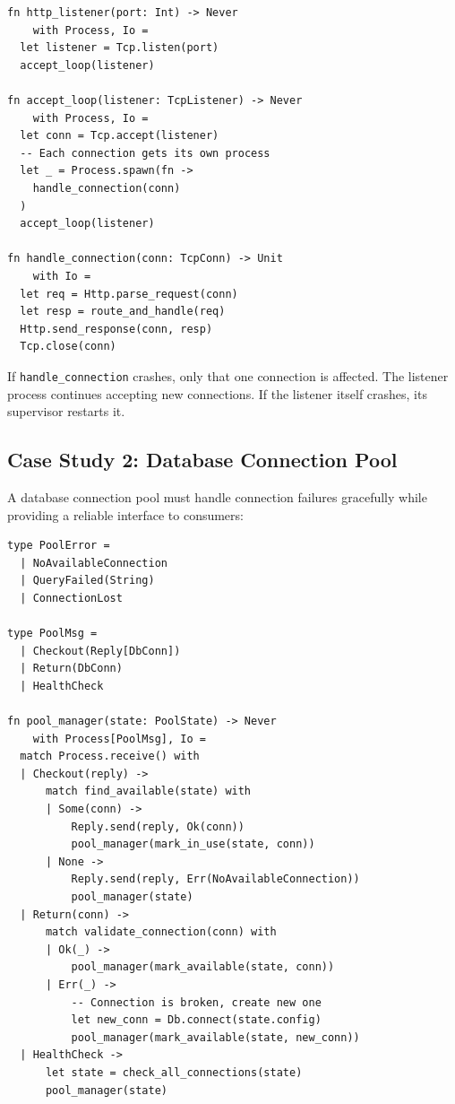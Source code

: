 \documentclass[11pt,twocolumn]{article}
\begin{document}
\begin{lstlisting}
fn http_listener(port: Int) -> Never
    with Process, Io =
  let listener = Tcp.listen(port)
  accept_loop(listener)

fn accept_loop(listener: TcpListener) -> Never
    with Process, Io =
  let conn = Tcp.accept(listener)
  -- Each connection gets its own process
  let _ = Process.spawn(fn ->
    handle_connection(conn)
  )
  accept_loop(listener)

fn handle_connection(conn: TcpConn) -> Unit
    with Io =
  let req = Http.parse_request(conn)
  let resp = route_and_handle(req)
  Http.send_response(conn, resp)
  Tcp.close(conn)
\end{lstlisting}

If \texttt{handle\_connection} crashes, only that one connection is affected. The listener process continues accepting new connections. If the listener itself crashes, its supervisor restarts it.

\subsection{Case Study 2: Database Connection Pool}

A database connection pool must handle connection failures gracefully while providing a reliable interface to consumers:

\begin{lstlisting}
type PoolError =
  | NoAvailableConnection
  | QueryFailed(String)
  | ConnectionLost

type PoolMsg =
  | Checkout(Reply[DbConn])
  | Return(DbConn)
  | HealthCheck

fn pool_manager(state: PoolState) -> Never
    with Process[PoolMsg], Io =
  match Process.receive() with
  | Checkout(reply) ->
      match find_available(state) with
      | Some(conn) ->
          Reply.send(reply, Ok(conn))
          pool_manager(mark_in_use(state, conn))
      | None ->
          Reply.send(reply, Err(NoAvailableConnection))
          pool_manager(state)
  | Return(conn) ->
      match validate_connection(conn) with
      | Ok(_) ->
          pool_manager(mark_available(state, conn))
      | Err(_) ->
          -- Connection is broken, create new one
          let new_conn = Db.connect(state.config)
          pool_manager(mark_available(state, new_conn))
  | HealthCheck ->
      let state = check_all_connections(state)
      pool_manager(state)
\end{lstlisting}
\end{document}
